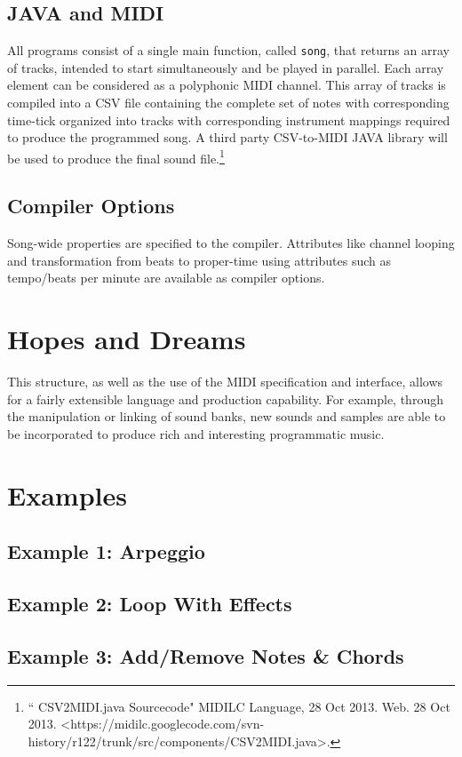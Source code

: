 \documentclass[letterpaper]{article}
\begin{document}
\subsection{JAVA and MIDI}
All programs consist of a single main function, called \texttt{song}, that returns an array of tracks, intended to start simultaneously and be played in parallel. Each array element can be considered as a polyphonic MIDI channel. This array of tracks is compiled into a CSV file containing the complete set of notes with corresponding time-tick organized into tracks with corresponding instrument mappings required to produce the programmed song. A third party CSV-to-MIDI JAVA library  will be used to produce the final sound file.\footnote[1]{`` CSV2MIDI.java Sourcecode" MIDILC Language, 28 Oct 2013. Web. 28 Oct 2013. \textless https://midilc.googlecode.com/svn-history/r122/trunk/src/components/CSV2MIDI.java\textgreater.}

\subsection{Compiler Options}
Song-wide properties are specified to the compiler. Attributes like channel looping and transformation from beats to proper-time using attributes such as tempo/beats per minute are available as compiler options.

\section{Hopes and Dreams}
This structure, as well as the use of the MIDI specification and interface, allows for a fairly extensible language and production capability. For example, through the manipulation or linking of sound banks, new sounds and samples are able to be incorporated to produce rich and interesting programmatic music.

\section{Examples}

\begin{minipage}{\linewidth}
\subsection{Example 1: Arpeggio}

\end{minipage}

\begin{minipage}{\linewidth}
\subsection{Example 2: Loop With Effects}

\end{minipage}

\begin{minipage}{\linewidth}
\subsection{Example 3: Add/Remove Notes \& Chords}

\end{minipage}
\end{document}
